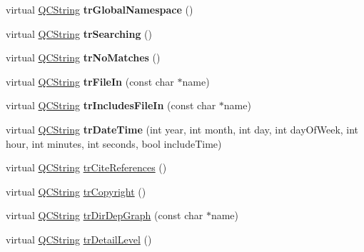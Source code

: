 \begin{DoxyCompactItemize}
\item 
\mbox{\label{class_translator_chinese_afe5ad317f28188e857a13deea536a4f2}} 
virtual \mbox{\hyperlink{class_q_c_string}{Q\+C\+String}} {\bfseries tr\+Global\+Namespace} ()
\item 
\mbox{\label{class_translator_chinese_a7f82dba97220eca352c25cc746828124}} 
virtual \mbox{\hyperlink{class_q_c_string}{Q\+C\+String}} {\bfseries tr\+Searching} ()
\item 
\mbox{\label{class_translator_chinese_af85df82328f721da14c8fea121ae8310}} 
virtual \mbox{\hyperlink{class_q_c_string}{Q\+C\+String}} {\bfseries tr\+No\+Matches} ()
\item 
\mbox{\label{class_translator_chinese_a4369da42391439eb5bb2318d2a0211f8}} 
virtual \mbox{\hyperlink{class_q_c_string}{Q\+C\+String}} {\bfseries tr\+File\+In} (const char $\ast$name)
\item 
\mbox{\label{class_translator_chinese_abaf5291e2c4297cd07a482ab756a6401}} 
virtual \mbox{\hyperlink{class_q_c_string}{Q\+C\+String}} {\bfseries tr\+Includes\+File\+In} (const char $\ast$name)
\item 
\mbox{\label{class_translator_chinese_a9440bfa8100d9e24f0db13310978cd25}} 
virtual \mbox{\hyperlink{class_q_c_string}{Q\+C\+String}} {\bfseries tr\+Date\+Time} (int year, int month, int day, int day\+Of\+Week, int hour, int minutes, int seconds, bool include\+Time)
\item 
virtual \mbox{\hyperlink{class_q_c_string}{Q\+C\+String}} \mbox{\hyperlink{class_translator_chinese_aa3bc2248a7f54c1b56d2b584b22de519}{tr\+Cite\+References}} ()
\item 
virtual \mbox{\hyperlink{class_q_c_string}{Q\+C\+String}} \mbox{\hyperlink{class_translator_chinese_a1623339d1e43357b1ba21f58a3382d43}{tr\+Copyright}} ()
\item 
virtual \mbox{\hyperlink{class_q_c_string}{Q\+C\+String}} \mbox{\hyperlink{class_translator_chinese_a6fd55ce82e675b31fc8c55c0b99c22a9}{tr\+Dir\+Dep\+Graph}} (const char $\ast$name)
\item 
virtual \mbox{\hyperlink{class_q_c_string}{Q\+C\+String}} \mbox{\hyperlink{class_translator_chinese_a03397b2ca00484884f7fb9be9d666d03}{tr\+Detail\+Level}} ()

\end{DoxyCompactItemize}
